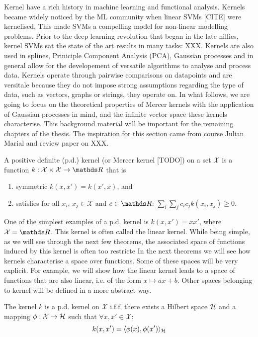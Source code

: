 Kernel have a rich history in machine learning and functional analysis. Kernels became widely noticed  by the ML community when linear SVMs [CITE] were kernelised. This made SVMs a compelling model for non-linear modelling problems. Prior to the deep learning revolution that began in the late nillies, kernel SVMs sat the state of the art results in many tasks: XXX. Kernels are also used in splines, Priniciple Component Analysis (PCA), Gaussian processes and in general allow for the developement of versatile algorithms to analyse and process data. Kernels operate through pairwise comparisons on datapoints and are versitale because they do not impose strong assumptions regarding the type of data, such as vectors, graphs or strings, they operate on. In what follows, we are going to focus on the theoretical properties of Mercer kernels with the application of Gaussian processes in mind, and the infinite vector space these kernels characterise. This background material will be important for the remaining chapters of the thesis. The inspiration for this section came from course Julian Marial and review paper on XXX.

\begin{definition}
A positive definite (p.d.) kernel (or Mercer kernel [TODO]) on a set $\mathcal{X}$ is a function $k: \mathcal{X} \times \mathcal{X} \rightarrow \Reals$ that is
\begin{enumerate}
  \item symmetric $k(x, x') = k(x', x)$, and
  \item satisfies for all $x_i$, $x_j \in \mathcal{X}$ and $c \in \Reals$: $\sum_{i}\sum_j c_i c_j k(x_i, x_j)\ge 0$.
\end{enumerate}
\end{definition}
One of the simplest examples of a p.d. kernel is $k(x, x') = xx'$, where $\mathcal{X} = \Reals$. This kernel is often called the linear kernel. While being simple, as we will see through the next few theorems, the associated space of functions induced by this kernel is often too restricte
In the next theorems we will see how kernels characterise a space over functions. Some of these spaces will be very explicit. For example, we will show how the linear kernel leads to a space of functions that are also linear, i.e. of the form $x \mapsto a x + b$. Other spaces belonging to kernel will be defined in a more abstract way. 

\begin{theorem}
  \label{theorem:k-and-H}
  The kernel $k$ is a p.d. kernel on $\mathcal{X}$ i.f.f. there exists a Hilbert space ${\mathcal{H}}$ and a mapping $\phi: \mathcal{X} \rightarrow {\mathcal{H}}$ such that $\forall x,x' \in \mathcal{X}$:
  \begin{equation}
    k(x, x') = \langle \phi(x), \phi(x') \rangle_{{\mathcal{H}}}
  \end{equation}
\end{theorem}


